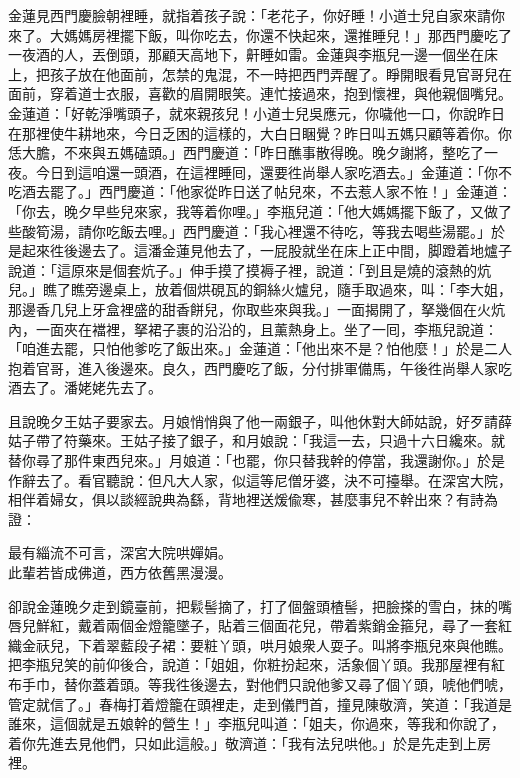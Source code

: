 金蓮見西門慶臉朝裡睡，就指着孩子說：「老花子，你好睡！小道士兒自家來請你來了。大媽媽房裡擺下飯，叫你吃去，你還不快起來，還推睡兒！」那西門慶吃了一夜酒的人，丟倒頭，那顧天高地下，鼾睡如雷。金蓮與李瓶兒一邊一個坐在床上，把孩子放在他面前，怎禁的鬼混，不一時把西門弄醒了。睜開眼看見官哥兒在面前，穿着道士衣服，喜歡的眉開眼笑。連忙接過來，抱到懷裡，與他親個嘴兒。金蓮道：「好乾淨嘴頭子，就來親孩兒！小道士兒吳應元，你噦他一口，你說昨日在那裡使牛耕地來，今日乏困的這樣的，大白日睏覺？昨日叫五媽只顧等着你。你恁大膽，不來與五媽磕頭。」{}西門慶道：「昨日醮事散得晚。晚夕謝將，整吃了一夜。今日到這咱還一頭酒，在這裡睡囘，還要徃尚舉人家吃酒去。」金蓮道：「你不吃酒去罷了。」西門慶道：「他家從昨日送了帖兒來，不去惹人家不恠！」金蓮道：「你去，晚夕早些兒來家，我等着你哩。」李瓶兒道：「他大媽媽擺下飯了，又做了些酸筍湯，請你吃飯去哩。」西門慶道：「我心裡還不待吃，等我去喝些湯罷。」於是起來徃後邊去了。這潘金蓮見他去了，一屁股就坐在床上正中間，脚蹬着地爐子說道：「這原來是個套炕子。」伸手摸了摸褥子裡，說道：「到且是燒的滾熱的炕兒。」瞧了瞧旁邊桌上，放着個烘硯瓦的銅絲火爐兒，隨手取過來，叫：「李大姐，那邊香几兒上牙盒裡盛的甜香餅兒，你取些來與我。」一面揭開了，拏幾個在火炕內，一面夾在襠裡，拏裙子裹的沿沿的，且薰熱身上。坐了一囘，李瓶兒說道：「咱進去罷，只怕他爹吃了飯出來。」金蓮道：「他出來不是？怕他麼！」於是二人抱着官哥，進入後邊來。良久，西門慶吃了飯，分付排軍備馬，午後徃尚舉人家吃酒去了。潘姥姥先去了。

且說晚夕王姑子要家去。月娘悄悄與了他一兩銀子，叫他休對大師姑說，好歹請薛姑子帶了符藥來。王姑子接了銀子，和月娘說：「我這一去，只過十六日纔來。就替你尋了那件東西兒來。」月娘道：「也罷，你只替我幹的停當，我還謝你。」於是作辭去了。看官聽說：但凡大人家，似這等尼僧牙婆，決不可擡舉。在深宮大院，相伴着婦女，俱以談經說典為繇，背地裡送煖偸寒，甚麼事兒不幹出來？有詩為證：

\begin{myquote}
最有緇流不可言，深宮大院哄嬋娟。\\此輩若皆成佛道，西方依舊黑漫漫。
\end{myquote}

卻說金蓮晚夕走到鏡臺前，把鬏髻摘了，打了個盤頭楂髻，把臉搽的雪白，抹的嘴唇兒鮮紅，戴着兩個金燈籠墜子，貼着三個面花兒，帶着紫銷金箍兒，尋了一套紅織金祆兒，下着翠藍段子裙：要粧丫頭，哄月娘衆人耍子。叫將李瓶兒來與他瞧。把李瓶兒笑的前仰後合，說道：「姐姐，你粧扮起來，活象個丫頭。我那屋裡有紅布手巾，替你蓋着頭。等我徃後邊去，對他們只說他爹又尋了個丫頭，唬他們唬，{}管定就信了。」春梅打着燈籠在頭裡走，走到儀門首，撞見陳敬濟，笑道：「我道是誰來，這個就是五娘幹的營生！」李瓶兒叫道：「姐夫，你過來，等我和你說了，着你先進去見他們，只如此這般。」敬濟道：「我有法兒哄他。」於是先走到上房裡。

